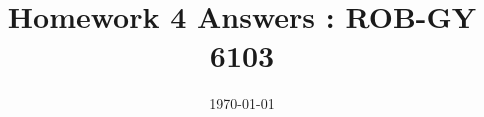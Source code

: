 \documentclass[a4paper]{article}
\title{Homework 4 Answers : ROB-GY 6103}
\author{\myName}
\date{\today}
\newcommand{\myName}{\textbf{Shantanu Ghodgaonkar}\\\textit{Univ ID}: N11344563\\\textit{Net ID}: sng8399\\\textit{Ph.No.}: +1 (929) 922-0614}
\begin{document}
%	
	
	\begin{qalist}			

\end{qalist}
\end{document}
